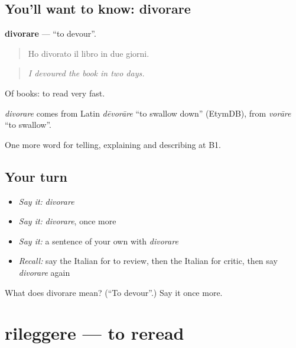 \subsection*{You'll want to know: divorare}
\textbf{divorare} — \textquotedblleft{}to devour\textquotedblright{}.

\begin{quote}
Ho divorato il libro in due giorni.
\end{quote}

\begin{quote}
\emph{I devoured the book in two days.}
\end{quote}

Of books: to read very fast.

\begin{cousinweb}
\emph{divorare} comes from Latin \emph{dēvorāre} \textquotedblleft{}to swallow down\textquotedblright{} (EtymDB), from \emph{vorāre} \textquotedblleft{}to swallow\textquotedblright{}.
\end{cousinweb}

\begin{grammarlens}[title={What you've built}]
One more word for telling, explaining and describing at B1.
\end{grammarlens}

\subsection*{Your turn}
\begin{itemize}
\raggedright
  \item \emph{Say it:} \emph{divorare}
  \item \emph{Say it:} \emph{divorare}, once more
  \item \emph{Say it:} a sentence of your own with \emph{divorare}
  \item \emph{Recall:} say the Italian for to review, then the Italian for critic, then say \emph{divorare} again
\end{itemize}

\begin{tcolorbox}[breakable,colback=teal!4,colframe=teal!35!black,title={Before you move on}]
What does divorare mean? (\textquotedblleft{}To devour\textquotedblright{}.) Say it once more.
\end{tcolorbox}
\section[rileggere]{rileggere — to reread}

